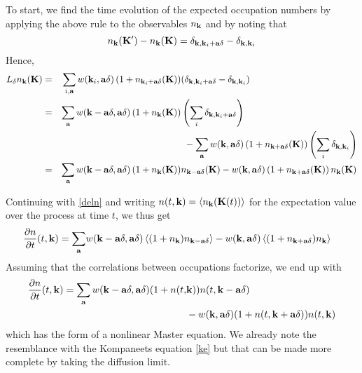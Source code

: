 \documentclass[a4paper,12pt,reqno,superscriptaddress,nofootinbib]{revtex4}
\newcommand{\0}{^{(0)}}
\newcommand{\1}{^{(1)}}
\newcommand{\2}{^{(2)}}
\begin{document}
To start, we find the time evolution of the expected occupation numbers by applying the above rule to the observables
$n_{\vb{k}}$ and by noting that  \[ n_{\vb{k}}(\vb{K}') - n_{\vb{k}}(\vb{K}) = \delta_{\vb{k},\vb{k}_i + \vb{a} 
	\delta} - \delta_{\vb{k},\vb{k}_i} \]
Hence,
\begin{alignat}{3}
L_\delta n_{\vb{k}} (\vb{K}) &=& \sum_{i,\vb{a}} w(\vb{k}_i,\vb{a}\delta) \left(1 + 
n_{\vb{k}_i+ \vb{a}\delta}(\vb{K}) \right)& (\delta_{\vb{k},\vb{k}_i + \vb{a} 
	\delta} - \delta_{\vb{k},\vb{k}_i} )\nonumber\\
&=& \sum_{\vb{a}} w( \vb{k} - \vb{a}\delta, \vb{a}\delta)
\left(1 + n_{\vb{k}}(\vb{K}) \right) &\left(\sum_i \delta_{\vb{k},\vb{k}_i + 
	\vb{a} \delta}\right) \nonumber\\
&& & \  -  \sum_{\vb{a}} w(\vb{k}, \vb{a} \delta) \left(1 + n_{\vb{k}+ \vb{a}\delta}(\vb{K}) 
\right) \left(\sum_i \delta_{\vb{k},\vb{k}_i} \right)\nonumber\\
&=& \sum_{\vb{a}}  w( \vb{k} - \vb{a}\delta, \vb{a}\delta)
\left(1 + n_{\vb{k}}(\vb{K}) \right)& n_{\vb{k} - \vb{a} \delta}(\vb{K}) - w(\vb{k}, \vb{a} \delta) \left(1 + n_{\vb{k}+ \vb{a}\delta}(\vb{K}) 
\right) n_{\vb{k}}(\vb{K})\label{deln}
\end{alignat}

Continuing with \eqref{deln} and writing $n(t,\vb{k}) = \left\langle n_{\vb{k}}(\vb{K}(t)) \right\rangle$ for the expectation value over the process at time $t$, we thus get
\begin{align*}
{\pdv{n}{t}} (t,\vb{k}) = \sum_{\vb{a}}&  w(\vb{k} - \vb{a} \delta, \vb{a}\delta) 
\left\langle (1 + n_{\vb{k}} ) n_{\vb{k} - \vb{a}\delta} \right\rangle 
-  w(\vb{k}, \vb{a}\delta) \left\langle (1 + n_{\vb{k}+\vb{a} \delta} ) 
n_{\vb{k}} \right\rangle
\end{align*}
Assuming that the correlations between occupations factorize, we end up with
\begin{align}
{\pdv{n}{t} }(t,\vb{k}) 
= \sum_{\vb{a}}  w(\vb{k} - \vb{a} \delta, \vb{a}\delta) (1 
+ n(t,&\vb{k})) n(t,\vb{k} - \vb{a}\delta) \nonumber \\
&-  w(\vb{k}, \vb{a}\delta) (1 + n(t,\vb{k}+\vb{a} \delta)) n(t,\vb{k})
\end{align}
which has the form of a nonlinear Master equation.  We already note the resemblance with the Kompaneets equation \eqref{ke} but that can be made more complete by taking the diffusion limit.
\end{document}
